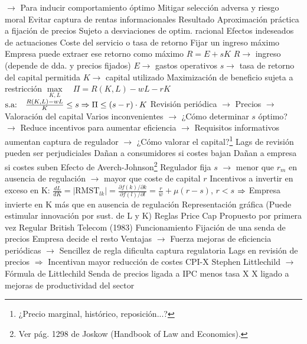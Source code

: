 \documentclass{nuevotema}
\begin{document}
\begin{esquemal}
				\4[] $\to$ Para inducir comportamiento óptimo
				\4[] Mitigar selección adversa y riesgo moral
				\4[] Evitar captura de rentas informacionales
				\4 Resultado
				\4[] Aproximación práctica a fijación de precios
				\4[] Sujeto a desviaciones de optim. racional
				\4[] Efectos indeseados de actuaciones
			\3 Coste del servicio o tasa de retorno
				\4 Fijar un ingreso máximo
				\4[] Empresa puede extraer ese retorno como máximo
				\4 $R = E + sK$
				\4[] $R \to$ ingreso (depende de dda. y precios fijados)
				\4[] $E \to$ gastos operativos
				\4[] $s \to$ tasa de retorno del capital permitida
				\4[] $K \to$ capital utilizado
				\4 Maximización de beneficio sujeta a restricción
				\4[] $\underset{K,L}{\max} \quad \Pi = R(K,L) - wL - rK$
				\4[] $\text{s.a:} \quad \frac{R(K,L) - wL}{K} \leq s \Rightarrow \Pi \leq (s-r) \cdot K$
				\4 Revisión periódica
				\4[] $\to$ Precios
				\4[] $\to$ Valoración del capital
				\4 Varios inconvenientes
				\4[] $\to$ ¿Cómo determinar $s$ óptimo?
				\4[] $\to$ Reduce incentivos para aumentar eficiencia
				\4[] $\to$ Requisitos informativos aumentan captura de regulador
				\4[] $\to$ ¿Cómo valorar el capital?\footnote{¿Precio marginal, histórico, reposición...?}
				\4[$\to$] Lags de revisión pueden ser perjudiciales
				\4[] Dañan a consumidores si costes bajan
				\4[] Dañan a empresa si costes suben
				\4[$\to$] Efecto de Averch-Johnson\footnote{Ver pág. 1298 de Joskow (Handbook of Law and Economics).}
				\4[] Regulador fija $s$
				\4[] $\to$ menor que $r_m$ en ausencia de regulación
				\4[] $\to$ mayor que coste de capital $r$
				\4[] Incentivos a invertir en exceso en K:
				\4[] $\frac{d L}{d K} = \left| \text{RMST}_{lk} \right| = \frac{ \partial f(k) / \partial k}{\partial f(l) / \partial l} = \frac{r}{w} + \mu(r-s)$, $r < s$
				\4[] $\Rightarrow$ Empresa invierte en K más que en ausencia de regulación
				\4[] Representación gráfica
				\4[] 
				\4[] (Puede estimular innovación por sust. de L y K)
			\3 Reglas Price Cap
				\4 Propuesto por primera vez
				\4[] Regular British Telecom (1983)
				\4 Funcionamiento
				\4[] Fijación de una senda de precios
				\4[] Empresa decide el resto
				\4 Ventajas
				\4[] $\to$ Fuerza mejoras de eficiencia periódicas
				\4[] $\to$ Sencillez de regla dificulta captura regulatoria
				\4 Lags en revisión de precios
				\4[] $\Rightarrow$ Incentivan mayor reducción de costes
				\4 CPI-X
				\4[] Stephen Littlechild $\to$ Fórmula de Littlechild
				\4[] Senda de precios ligada a IPC menos tasa X
				\4[] X ligado a mejoras de productividad del sector

\end{esquemal}
\end{document}
